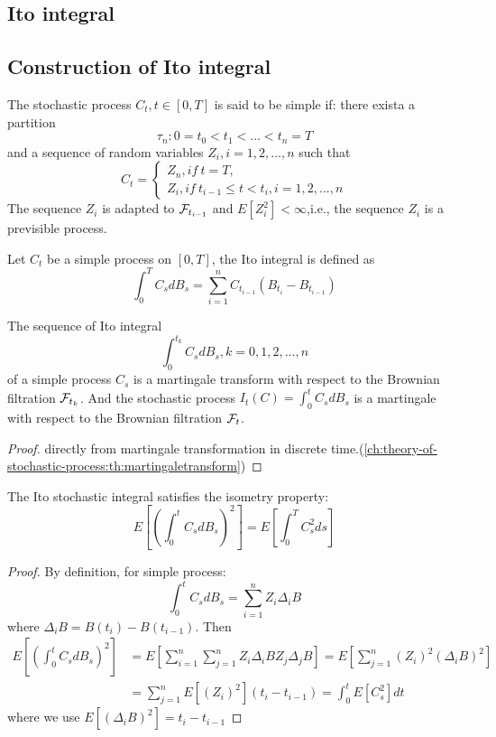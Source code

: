 \begin{refsection}
\section{Ito integral}
\subsection{Construction of Ito integral}
\begin{definition}
	The stochastic process $C_t, t\in [0,T]$ is said to be simple if:
	there exista a partition
	$$\tau_n: 0 =t_0 < t_1 < ... < t_n = T$$
	and a sequence of random variables $Z_i,i=1,2,...,n$ such that 
	$$C_t = \begin{cases} Z_n, if ~ t=T,\\
	Z_i, if ~ t_{i-1} \leq t < t_i, i=1,2,...,n
	\end{cases}$$
	The sequence $Z_i$ is adapted to $\mathcal{F}_{t_{i-1}}$ and $E[Z_i^2] < \infty$,i.e., the sequence $Z_i$ is a previsible process.
\end{definition}

\begin{definition}
	Let $C_t$ be a simple process on $[0,T]$, the Ito integral is defined as
	$$\int_0^T C_s dB_s = \sum_{i=1}^n C_{t_{i-1}}(B_{t_{i}}-B_{t_{i-1}})$$
\end{definition}


\begin{theorem}\label{ch:theory-of-stochastic-process:th:ItointegralasMartingale}
	The sequence of Ito integral
	$$\int_0^{t_k} C_s dB_s,k=0,1,2,...,n$$
	of a simple process $C_s$ is a martingale transform with respect to the Brownian filtration $\mathcal{F}_{t_k}$. And the stochastic process $I_t(C) =\int_0^t C_sdB_s$ is a martingale with respect to the Brownian filtration $\mathcal{F}_t$.
\end{theorem}
\begin{proof}
	directly from martingale transformation in discrete time.(\autoref{ch:theory-of-stochastic-process:th:martingaletransform})
\end{proof}



\begin{theorem}
	The Ito stochastic integral satisfies the isometry property:
	$$E[(\int_0^t C_sdB_s)^2] = E[\int_0^T C_s^2 ds]$$
\end{theorem}
\begin{proof}
	By definition, for simple process: $$\int_0^t C_sdB_s = \sum_{i=1}^n Z_i \Delta_i B$$
	where $\Delta_i B = B(t_i) - B(t_{i-1})$. Then
	\begin{align*}
	E[(\int_0^t C_sdB_s)^2] &= E[\sum_{i=1}^n \sum_{j=1}^n Z_i \Delta_i B Z_j \Delta_j B] = E[\sum_{j=1}^n (Z_i)^2 (\Delta_i B)^2] \\&= \sum_{j=1}^n E[(Z_i)^2](t_i - t_{i-1}) = \int_0^t E[C_s^2]dt 
	\end{align*}
	where we use $E[(\Delta_i B)^2]=t_i-t_{i-1}$ 
\end{proof}


\end{refsection}
